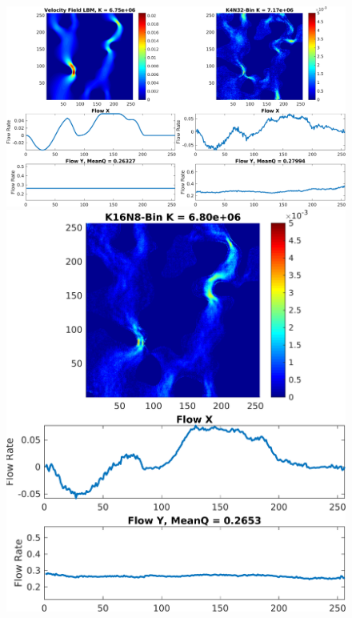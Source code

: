 \documentclass{article}
\begin{document}
\begin{figure}[htp!]
  \centering
  \begin{minipage}[b]{0.66\textwidth}
    \includegraphics[width=\textwidth]{figures/velCNNs1117-1.png}
  \end{minipage}
  \vspace{5mm}
    \begin{minipage}[b]{0.33\textwidth}
    \includegraphics[width=\textwidth]{figures/velCNNs1117-3.png}

\end{minipage}
\end{figure}
\end{document}
